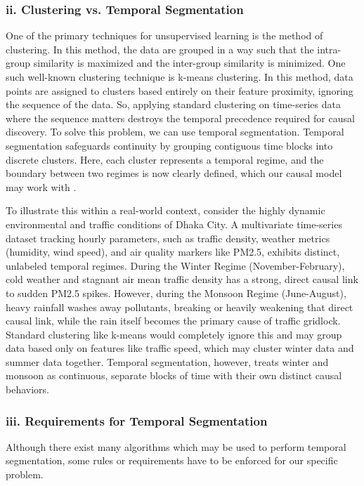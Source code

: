 \subsubsection*{ii. Clustering vs. Temporal Segmentation}

One of the primary techniques for unsupervised learning is the method of clustering. In this method, the data are grouped in a way such that the intra-group similarity is maximized and the inter-group similarity is minimized. One such well-known clustering technique is k-means clustering. In this method, data points are assigned to clusters based entirely on their feature proximity, ignoring the sequence of the data. So, applying standard clustering on time-series data where the sequence matters destroys the temporal precedence required for causal discovery. To solve this problem, we can use temporal segmentation. Temporal segmentation safeguards continuity by grouping contiguous time blocks into discrete clusters. Here, each cluster represents a temporal regime, and the boundary between two regimes is now clearly defined, which our causal model may work with \cite{assaad2022survey}. 

To illustrate this within a real-world context, consider the highly dynamic environmental and traffic conditions of Dhaka City. A multivariate time-series dataset tracking hourly parameters, such as traffic density, weather metrics (humidity, wind speed), and air quality markers like PM2.5, exhibits distinct, unlabeled temporal regimes. During the Winter Regime (November-February), cold weather and stagnant air mean traffic density has a strong, direct causal link to sudden PM2.5 spikes. However, during the Monsoon Regime (June-August), heavy rainfall washes away pollutants, breaking or heavily weakening that direct causal link, while the rain itself becomes the primary cause of traffic gridlock. Standard clustering like k-means would completely ignore this and may group data based only on features like traffic speed, which may cluster winter data and summer data together. Temporal segmentation, however, treats winter and monsoon as continuous, separate blocks of time with their own distinct causal behaviors.

\subsubsection*{iii. Requirements for Temporal Segmentation}

Although there exist many algorithms which may be used to perform temporal segmentation, some rules or requirements have to be enforced for our specific problem.

